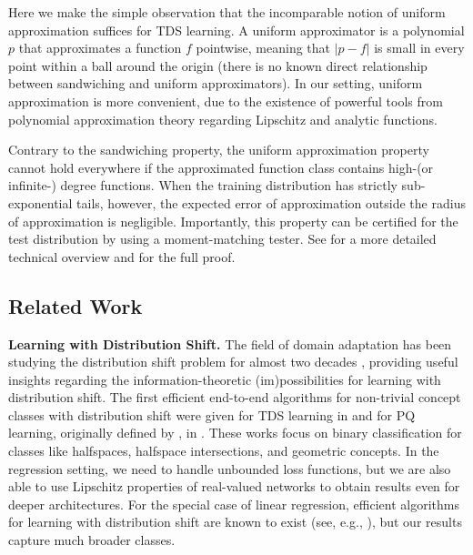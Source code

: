 \documentclass[11pt]{article} %
\numberwithin{equation}{section}
\begin{document}
Here we make the simple observation that the incomparable notion of uniform approximation suffices for TDS learning.  A uniform approximator is a polynomial $p$ that approximates a function $f$ pointwise, meaning that $|p-f|$ is small in every point within a ball around the origin (there is no known direct relationship between sandwiching and uniform approximators). In our setting, uniform approximation is more convenient, due to the existence of powerful tools from polynomial approximation theory regarding Lipschitz and analytic functions.

Contrary to the sandwiching property, the uniform approximation property cannot hold everywhere if the approximated function class contains high-(or infinite-) degree functions. 
When the training distribution has strictly sub-exponential tails, however, the expected error of approximation outside the radius of approximation is negligible. Importantly, this property can be certified for the test distribution by using a moment-matching tester. See  for a more detailed technical overview and for the full proof.

\subsection{Related Work}

\noindent\textbf{Learning with Distribution Shift.} The field of domain adaptation has been studying the distribution shift problem for almost two decades \cite{ben2006analysis,blitzer2007learning,ben2010theory,mansour2009domadapt,david2010impossibility,mousavi2020minimax,redko2020survey,kalavasis2024transfer,hanneke2019value,hanneke2024more,awasthi2024best}, providing useful insights regarding the information-theoretic (im)possibilities for learning with distribution shift. The first efficient end-to-end algorithms for non-trivial concept classes with distribution shift were given for TDS learning in \cite{klivans2023testable,klivans2024learning,chandrasekaran2024efficient} and for PQ learning, originally defined by \cite{goldwasser2020beyond}, in \cite{goel2024tolerant}. These works focus on binary classification for classes like halfspaces, halfspace intersections, and geometric concepts. In the regression setting, we need to handle unbounded loss functions, but we are also able to use Lipschitz properties of real-valued networks to obtain results even for deeper architectures. For the special case of linear regression, efficient algorithms for learning with distribution shift are known to exist (see, e.g., \cite{lei2021near}), but our results capture much broader classes. 
\end{document}
